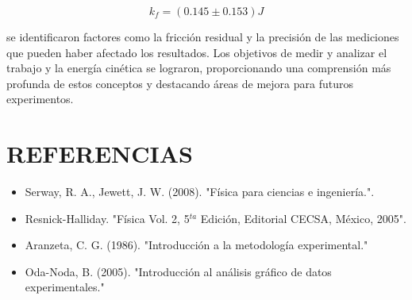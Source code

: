 \documentclass[journal]{IEEEtran}
\begin{document}
\begin{equation}\label{eq:6}
    k_f = (0.145 \pm 0.153)J
\end{equation}

se identificaron factores como la fricción residual y la precisión de las mediciones que pueden haber afectado los resultados. Los objetivos de medir y analizar el trabajo y la energía cinética se lograron, proporcionando una comprensión más profunda de estos conceptos y destacando áreas de mejora para futuros experimentos.



\section{ REFERENCIAS}
\begin{itemize}
\item Serway, R. A., Jewett, J. W. (2008). "Física para ciencias e ingeniería.".
\item Resnick-Halliday. "Física Vol. 2, 5$^{ta}$ Edición, Editorial CECSA, México, 2005".
\item Aranzeta, C. G. (1986). "Introducción a la metodología experimental."
\item Oda-Noda, B. (2005). "Introducción al análisis gráfico de datos experimentales." 
\end{itemize}
\end{document}
